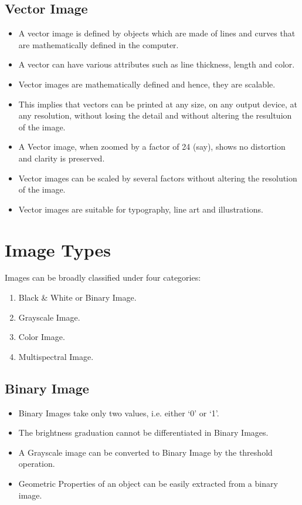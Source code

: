 \subsection{Vector Image}

\begin{itemize}
    \item A vector image is defined by objects which are made of lines and curves that are mathematically defined in the computer.
    \item A vector can have various attributes such as line thickness, length and color.
    \item Vector images are mathematically defined and hence, they are scalable.
    \item This implies that vectors can be printed at any size, on any output device, at any resolution, without losing the detail and without altering the resultuion of the image.
    \item A Vector image, when zoomed by a factor of 24 (say), shows no distortion and clarity is preserved.
    \item Vector images can be scaled by several factors without altering the resolution of the image.
    \item Vector images are suitable for typography, line art and illustrations.
\end{itemize}

\section{Image Types}

Images can be broadly classified under four categories:
\begin{enumerate}
    \item Black \& White or Binary Image.
    \item Grayscale Image.
    \item Color Image.
    \item Multispectral Image.
\end{enumerate}

\subsection{Binary Image}
\begin{itemize}
    \item Binary Images take only two values, i.e. either `0' or `1'.
    \item The brightness graduation cannot be differentiated in Binary Images.
    \item A Grayscale image can be converted to Binary Image by the threshold operation.
    \item Geometric Properties of an object can be easily extracted from a binary image.
\end{itemize}

